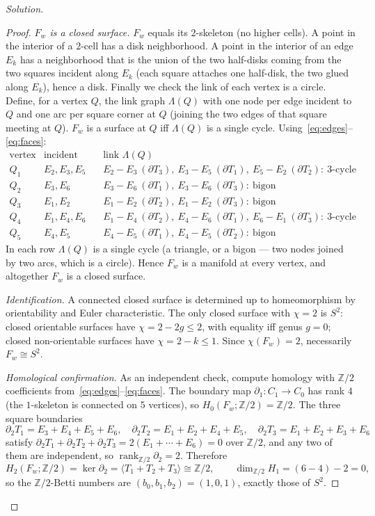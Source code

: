 \documentclass{amsart}
\theoremstyle{definition}
\newcommand{\ZZ}{\mathbb{Z}}
\newcommand{\bdy}{\partial}
\begin{document}
\begin{proof}[Solution]
\begin{proof}
\emph{$F_w$ is a closed surface.} $F_w$ equals its $2$-skeleton (no higher cells). A point in
the interior of a $2$-cell has a disk neighborhood. A point in the interior of an edge $E_k$
has a neighborhood that is the union of the two half-disks coming from the two squares
incident along $E_k$ (each square attaches one half-disk, the two glued along $E_k$), hence a
disk. Finally we check the link of each vertex is a circle. Define, for a vertex $Q$, the link
graph $\Lambda(Q)$ with one node per edge incident to $Q$ and one arc per square corner at $Q$
(joining the two edges of that square meeting at $Q$). $F_w$ is a surface at $Q$ iff
$\Lambda(Q)$ is a single cycle. Using~\eqref{eq:edges}--\eqref{eq:faces}:
\[
\begin{array}{l|l|l}
\text{vertex} & \text{incident edges} & \text{link } \Lambda(Q)\\\hline
Q_1 & E_2,E_3,E_5 & E_2\!-\!E_3\ (\bdy T_3),\ E_3\!-\!E_5\ (\bdy T_1),\ E_5\!-\!E_2\ (\bdy T_2):\ \text{3-cycle}\\
Q_2 & E_3,E_6 & E_3\!-\!E_6\ (\bdy T_1),\ E_3\!-\!E_6\ (\bdy T_3):\ \text{bigon}\\
Q_3 & E_1,E_2 & E_1\!-\!E_2\ (\bdy T_2),\ E_1\!-\!E_2\ (\bdy T_3):\ \text{bigon}\\
Q_4 & E_1,E_4,E_6 & E_1\!-\!E_4\ (\bdy T_2),\ E_4\!-\!E_6\ (\bdy T_1),\ E_6\!-\!E_1\ (\bdy T_3):\ \text{3-cycle}\\
Q_5 & E_4,E_5 & E_4\!-\!E_5\ (\bdy T_1),\ E_4\!-\!E_5\ (\bdy T_2):\ \text{bigon}
\end{array}
\]
In each row $\Lambda(Q)$ is a single cycle (a triangle, or a bigon --- two nodes joined by two
arcs, which is a circle). Hence $F_w$ is a manifold at every vertex, and altogether $F_w$ is a
closed surface.

\emph{Identification.} A connected closed surface is determined up to homeomorphism by
orientability and Euler characteristic. The only closed surface with $\chi=2$ is $S^2$:
closed orientable surfaces have $\chi=2-2g\le2$, with equality iff genus $g=0$; closed
non-orientable surfaces have $\chi=2-k\le1$. Since $\chi(F_w)=2$, necessarily $F_w\cong S^2$.

\emph{Homological confirmation.} As an independent check, compute homology with $\ZZ/2$
coefficients from~\eqref{eq:edges}--\eqref{eq:faces}. The boundary map
$\partial_1:C_1\to C_0$ has rank $4$ (the $1$-skeleton is connected on $5$ vertices), so
$H_0(F_w;\ZZ/2)=\ZZ/2$. The three square boundaries
\[
\partial_2T_1=E_3+E_4+E_5+E_6,\quad
\partial_2T_2=E_1+E_2+E_4+E_5,\quad
\partial_2T_3=E_1+E_2+E_3+E_6
\]
satisfy $\partial_2T_1+\partial_2T_2+\partial_2T_3=2(E_1+\cdots+E_6)=0$ over $\ZZ/2$, and any
two of them are independent, so $\operatorname{rank}_{\ZZ/2}\partial_2=2$. Therefore
\[
H_2(F_w;\ZZ/2)=\ker\partial_2=\langle T_1+T_2+T_3\rangle\cong\ZZ/2,\qquad
\dim_{\ZZ/2}H_1=(6-4)-2=0,
\]
so the $\ZZ/2$-Betti numbers are $(b_0,b_1,b_2)=(1,0,1)$, exactly those of $S^2$.


\end{proof}
\end{proof}
\end{document}
